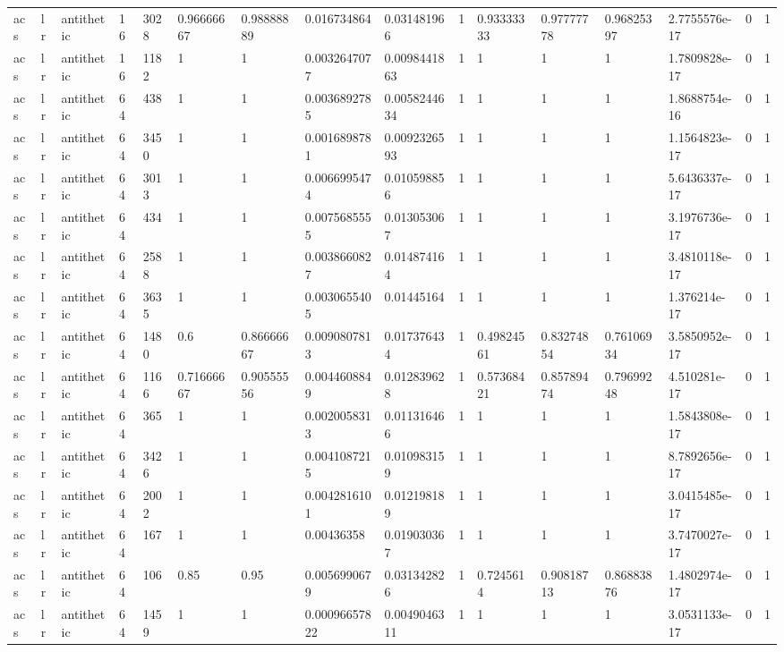 \begin{tabular}{llllllllllllllll}
acs & lr & antithetic & 16 & 3028 & 0.96666667 & 0.98888889 & 0.016734864 & 0.031481966 & 1 & 0.93333333 & 0.97777778 & 0.96825397 & 2.7755576e-17 & 0 & 1 \\
acs & lr & antithetic & 16 & 1182 & 1 & 1 & 0.0032647077 & 0.0098441863 & 1 & 1 & 1 & 1 & 1.7809828e-17 & 0 & 1 \\
acs & lr & antithetic & 64 & 438 & 1 & 1 & 0.0036892785 & 0.0058244634 & 1 & 1 & 1 & 1 & 1.8688754e-16 & 0 & 1 \\
acs & lr & antithetic & 64 & 3450 & 1 & 1 & 0.0016898781 & 0.0092326593 & 1 & 1 & 1 & 1 & 1.1564823e-17 & 0 & 1 \\
acs & lr & antithetic & 64 & 3013 & 1 & 1 & 0.0066995474 & 0.010598856 & 1 & 1 & 1 & 1 & 5.6436337e-17 & 0 & 1 \\
acs & lr & antithetic & 64 & 434 & 1 & 1 & 0.0075685555 & 0.013053067 & 1 & 1 & 1 & 1 & 3.1976736e-17 & 0 & 1 \\
acs & lr & antithetic & 64 & 2588 & 1 & 1 & 0.0038660827 & 0.014874164 & 1 & 1 & 1 & 1 & 3.4810118e-17 & 0 & 1 \\
acs & lr & antithetic & 64 & 3635 & 1 & 1 & 0.0030655405 & 0.01445164 & 1 & 1 & 1 & 1 & 1.376214e-17 & 0 & 1 \\
acs & lr & antithetic & 64 & 1480 & 0.6 & 0.86666667 & 0.0090807813 & 0.017376434 & 1 & 0.49824561 & 0.83274854 & 0.76106934 & 3.5850952e-17 & 0 & 1 \\
acs & lr & antithetic & 64 & 1166 & 0.71666667 & 0.90555556 & 0.0044608849 & 0.012839628 & 1 & 0.57368421 & 0.85789474 & 0.79699248 & 4.510281e-17 & 0 & 1 \\
acs & lr & antithetic & 64 & 365 & 1 & 1 & 0.0020058313 & 0.011316466 & 1 & 1 & 1 & 1 & 1.5843808e-17 & 0 & 1 \\
acs & lr & antithetic & 64 & 3426 & 1 & 1 & 0.0041087215 & 0.010983159 & 1 & 1 & 1 & 1 & 8.7892656e-17 & 0 & 1 \\
acs & lr & antithetic & 64 & 2002 & 1 & 1 & 0.0042816101 & 0.012198189 & 1 & 1 & 1 & 1 & 3.0415485e-17 & 0 & 1 \\
acs & lr & antithetic & 64 & 167 & 1 & 1 & 0.00436358 & 0.019030367 & 1 & 1 & 1 & 1 & 3.7470027e-17 & 0 & 1 \\
acs & lr & antithetic & 64 & 106 & 0.85 & 0.95 & 0.0056990679 & 0.031342826 & 1 & 0.7245614 & 0.90818713 & 0.86883876 & 1.4802974e-17 & 0 & 1 \\
acs & lr & antithetic & 64 & 1459 & 1 & 1 & 0.00096657822 & 0.0049046311 & 1 & 1 & 1 & 1 & 3.0531133e-17 & 0 & 1 \\

\end{tabular}
